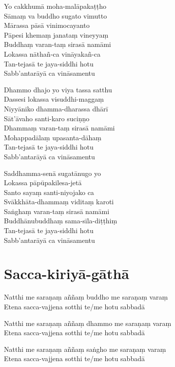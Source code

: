 \begin{paritta}
Yo cakkhumā moha-malāpakaṭṭho\\
Sāmaṃ va buddho sugato vimutto\\
Mārassa pāsā vinimocayanto\\
Pāpesi khemaṃ janataṃ vineyyaṃ\\
Buddhaṃ varan-taṃ sirasā namāmi\\
Lokassa nāthañ-ca vināyakañ-ca\\
Tan-tejasā te jaya-siddhi hotu\\
Sabb'antarāyā ca vināsamentu

Dhammo dhajo yo viya tassa satthu\\
Dassesi lokassa visuddhi-maggaṃ\\
Niyyāniko dhamma-dharassa dhārī\\
Sāt'āvaho santi-karo suciṇṇo\\
Dhammaṃ varan-taṃ sirasā namāmi\\
Mohappadālaṃ upasanta-dāhaṃ\\
Tan-tejasā te jaya-siddhi hotu\\
Sabb'antarāyā ca vināsamentu

Saddhamma-senā sugatānugo yo\\
Lokassa pāpūpakilesa-jetā\\
Santo sayaṃ santi-niyojako ca\\
Svākkhāta-dhammaṃ viditaṃ karoti\\
Saṅghaṃ varan-taṃ sirasā namāmi\\
Buddhānubuddhaṃ sama-sīla-diṭṭhiṃ\\
Tan-tejasā te jaya-siddhi hotu\\
Sabb'antarāyā ca vināsamentu
\end{paritta}

\section{Sacca-kiriyā-gāthā}

Natthi me saraṇaṃ aññaṃ buddho me saraṇaṃ varaṃ\\
Etena sacca-vajjena sotthi te/me hotu sabbadā

Natthi me saraṇaṃ aññaṃ dhammo me saraṇaṃ varaṃ\\
Etena sacca-vajjena sotthi te/me hotu sabbadā

Natthi me saraṇaṃ aññaṃ saṅgho me saraṇaṃ varaṃ\\
Etena sacca-vajjena sotthi te/me hotu sabbadā

